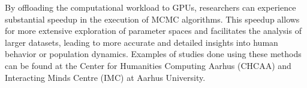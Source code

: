 \par
By offloading the computational workload to GPUs, researchers can experience substantial speedup in the execution of MCMC algorithms.
This speedup allows for more extensive exploration of parameter spaces and facilitates the analysis of larger datasets, leading to more accurate and detailed insights into human behavior or population dynamics.
Examples of studies done using these methods can be found at the Center for Humanities Computing Aarhus (CHCAA) and Interacting Minds Centre (IMC) at Aarhus University.

